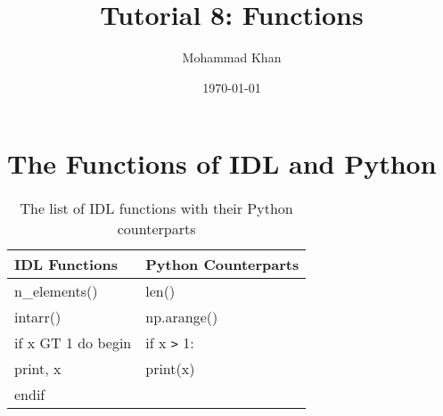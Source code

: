 \documentclass[12pt]{article}
\title{Tutorial 8: Functions}
\author{Mohammad Khan}
\date{\today}
\begin{document}
\maketitle

\section{The Functions of IDL and Python}

\begin{table}[h!]
  \centering
  \begin{tabular}{| l | l |}
    \hline
    \textbf{IDL Functions} & \textbf{Python Counterparts} \\ \hline
    n\_elements() & len() \\ \hline
    intarr() & np.arange() \\ \hline
    if x GT 1 do begin & if x \verb!>! 1: \\
    \hspace{5 mm}print, x & \hspace{5 mm}print(x) \\
    endif & \\ \hline
  \end{tabular}
  \caption{The list of IDL functions with their Python counterparts} 
\end{table}
\end{document}
